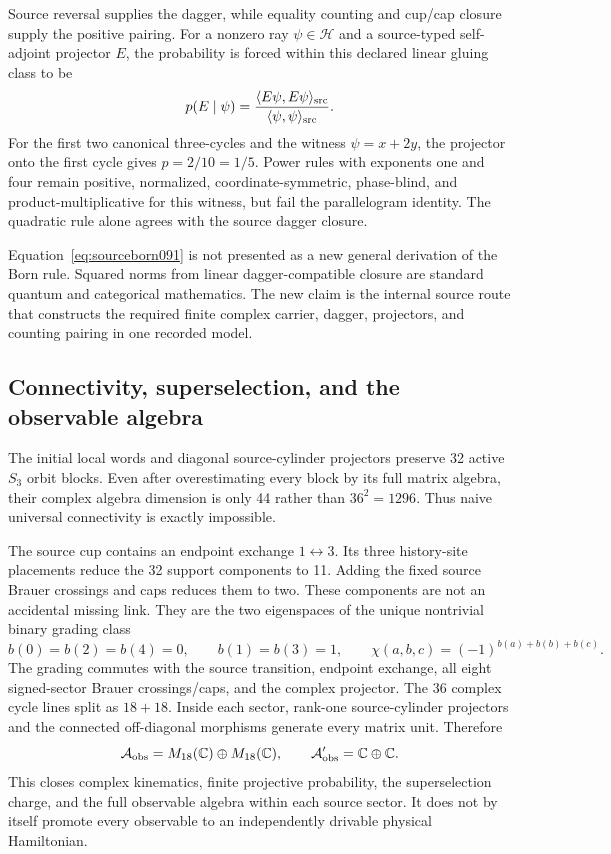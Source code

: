 \documentclass[11pt]{article}
\theoremstyle{definition}
\theoremstyle{remark}
\begin{document}
Source reversal supplies the dagger, while equality counting and cup/cap closure supply the positive pairing. For a nonzero ray $\psi\in\mathcal H$ and a source-typed self-adjoint projector $E$, the probability is forced within this declared linear gluing class to be
\begin{equation}
 p(E\mid\psi)
 =\frac{\langle E\psi,E\psi\rangle_{\rm src}}
 {\langle\psi,\psi\rangle_{\rm src}}.
 \label{eq:sourceborn091}
\end{equation}
For the first two canonical three-cycles and the witness $\psi=x+2y$, the projector onto the first cycle gives $p=2/10=1/5$. Power rules with exponents one and four remain positive, normalized, coordinate-symmetric, phase-blind, and product-multiplicative for this witness, but fail the parallelogram identity. The quadratic rule alone agrees with the source dagger closure.

Equation~\eqref{eq:sourceborn091} is not presented as a new general derivation of the Born rule. Squared norms from linear dagger-compatible closure are standard quantum and categorical mathematics. The new claim is the internal source route that constructs the required finite complex carrier, dagger, projectors, and counting pairing in one recorded model.

\subsection{Connectivity, superselection, and the observable algebra}

The initial local words and diagonal source-cylinder projectors preserve 32 active $S_3$ orbit blocks. Even after overestimating every block by its full matrix algebra, their complex algebra dimension is only 44 rather than $36^2=1296$. Thus naive universal connectivity is exactly impossible.

The source cup contains an endpoint exchange $1\leftrightarrow3$. Its three history-site placements reduce the 32 support components to 11. Adding the fixed source Brauer crossings and caps reduces them to two. These components are not an accidental missing link. They are the two eigenspaces of the unique nontrivial binary grading class
\begin{equation}
 b(0)=b(2)=b(4)=0,\qquad b(1)=b(3)=1,\qquad
 \chi(a,b,c)=(-1)^{b(a)+b(b)+b(c)}.
\end{equation}
The grading commutes with the source transition, endpoint exchange, all eight signed-sector Brauer crossings/caps, and the complex projector. The 36 complex cycle lines split as $18+18$. Inside each sector, rank-one source-cylinder projectors and the connected off-diagonal morphisms generate every matrix unit. Therefore
\begin{equation}
 \mathcal A_{\rm obs}
 =M_{18}(\mathbb C)\oplus M_{18}(\mathbb C),\qquad
 \mathcal A_{\rm obs}'=\mathbb C\oplus\mathbb C.
 \label{eq:obsalgebra091}
\end{equation}
This closes complex kinematics, finite projective probability, the superselection charge, and the full observable algebra within each source sector. It does not by itself promote every observable to an independently drivable physical Hamiltonian.
\end{document}
